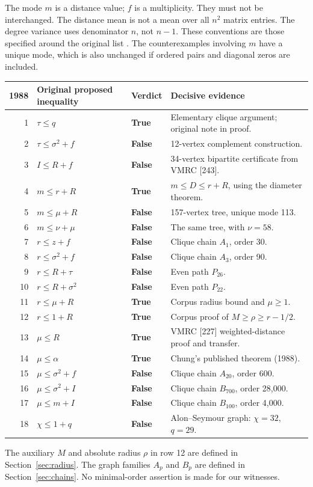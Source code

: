 \documentclass[11pt,a4paper]{article}
\theoremstyle{remark}\newtheorem{remark}[theorem]{Remark}
\newcommand{\TRUE}{\textcolor{accent}{\textbf{True}}}
\newcommand{\FALSE}{\textcolor{falsecol}{\textbf{False}}}
\begin{document}
The mode $m$ is a distance value; $f$ is a multiplicity. They must not be
interchanged. The distance mean is not a mean over all $n^2$ matrix entries.
The degree variance uses denominator $n$, not $n-1$. These conventions are
those specified around the original list \cite[pp.~114--115]{fajtlowicz}.
The counterexamples involving $m$ have a unique mode, which is also unchanged
if ordered pairs and diagonal zeros are included.

\begin{center}\small
\begin{tabularx}{\linewidth}{@{}r l l X@{}}\toprule
1988 & Original proposed inequality & Verdict & Decisive evidence\\\midrule
1 & $\tau\le q$ & \TRUE & Elementary clique argument; original note in proof.\\
2 & $\tau\le\sigma^2+f$ & \FALSE & 12-vertex complement construction.\\
3 & $I\le R+f$ & \FALSE & 34-vertex bipartite certificate from VMRC [243].\\
4 & $m\le r+R$ & \TRUE & $m\le D\le r+R$, using the diameter theorem.\\
5 & $m\le\mu+R$ & \FALSE & 157-vertex tree, unique mode 113.\\
6 & $m\le\nu+\mu$ & \FALSE & The same tree, with $\nu=58$.\\
7 & $r\le z+f$ & \FALSE & Clique chain $A_1$, order 30.\\
8 & $r\le\sigma^2+f$ & \FALSE & Clique chain $A_3$, order 90.\\
9 & $r\le R+\tau$ & \FALSE & Even path $P_{26}$.\\
10 & $r\le R+\sigma^2$ & \FALSE & Even path $P_{22}$.\\
11 & $r\le\mu+R$ & \TRUE & Corpus radius bound and $\mu\ge1$.\\
12 & $r\le1+R$ & \TRUE & Corpus proof of $M\ge\rho\ge r-1/2$.\\
13 & $\mu\le R$ & \TRUE & VMRC [227] weighted-distance proof and transfer.\\
14 & $\mu\le\alpha$ & \TRUE & Chung's published theorem (1988).\\
15 & $\mu\le\sigma^2+f$ & \FALSE & Clique chain $A_{20}$, order 600.\\
16 & $\mu\le\sigma^2+I$ & \FALSE & Clique chain $B_{700}$, order 28,000.\\
17 & $\mu\le m+I$ & \FALSE & Clique chain $B_{100}$, order 4,000.\\
18 & $\chi\le1+q$ & \FALSE & Alon--Seymour graph: $\chi=32$, $q=29$.\\\bottomrule
\end{tabularx}
\end{center}
The auxiliary $M$ and absolute radius $\rho$ in row 12 are defined in
Section~\ref{sec:radius}. The graph families $A_p$ and $B_p$ are defined in
Section~\ref{sec:chains}. No minimal-order assertion is made for our witnesses.
\end{document}
